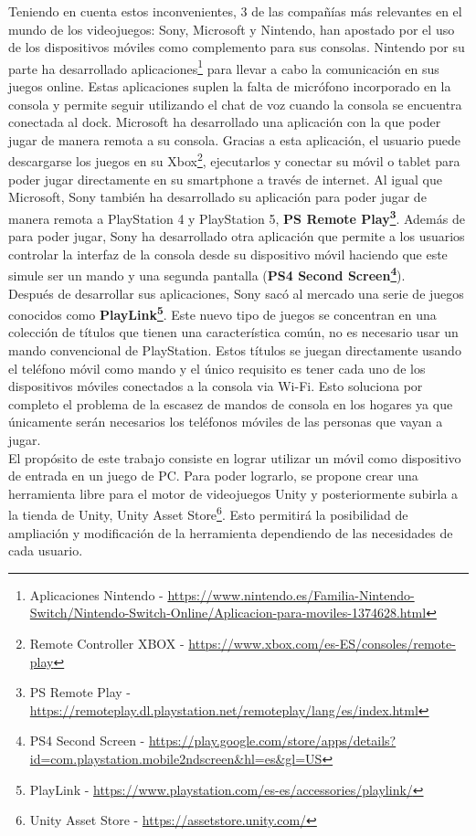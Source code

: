 Teniendo en cuenta estos inconvenientes, 3 de las compa\~n\'ias m\'as relevantes en el mundo de los videojuegos: Sony, Microsoft y Nintendo, han apostado por el uso de los dispositivos m\'oviles como complemento para sus consolas. Nintendo por su parte ha desarrollado aplicaciones\footnote{Aplicaciones Nintendo - \url{https://www.nintendo.es/Familia-Nintendo-Switch/Nintendo-Switch-Online/Aplicacion-para-moviles-1374628.html}} para llevar a cabo la comunicaci\'on en sus juegos online. Estas aplicaciones suplen la falta de micr\'ofono incorporado en la consola y permite seguir utilizando el chat de voz cuando la consola se encuentra conectada al dock. Microsoft ha desarrollado una aplicaci\'on con la que poder jugar de manera remota a su consola. Gracias a esta aplicaci\'on, el usuario puede descargarse los juegos en su Xbox\footnote{ Remote Controller XBOX - \url{https://www.xbox.com/es-ES/consoles/remote-play}}, ejecutarlos y conectar su m\'ovil o tablet para poder jugar directamente en su smartphone a trav\'es de internet. Al igual que Microsoft, Sony tambi\'en ha desarrollado su aplicaci\'on para poder jugar de manera remota a PlayStation 4 y PlayStation 5, \textbf{PS Remote Play\footnote{PS Remote Play - \url{https://remoteplay.dl.playstation.net/remoteplay/lang/es/index.html}}}. Adem\'as de para poder jugar, Sony ha desarrollado otra aplicaci\'on que permite a los usuarios controlar la interfaz de la consola desde su dispositivo m\'ovil haciendo que este simule ser un mando y una segunda pantalla (\textbf{PS4 Second Screen\footnote{PS4 Second Screen - \url{https://play.google.com/store/apps/details?id=com.playstation.mobile2ndscreen&hl=es&gl=US}}}).\\

Despu\'es de desarrollar sus aplicaciones, Sony sac\'o al mercado una serie de juegos conocidos como \textbf{PlayLink\footnote{PlayLink - \url{https://www.playstation.com/es-es/accessories/playlink/}}}. Este nuevo tipo de juegos se concentran en una colecci\'on de t\'itulos que tienen una caracter\'istica com\'un, no es necesario usar un mando convencional de PlayStation. Estos t\'itulos se juegan directamente usando el tel\'efono m\'ovil como mando y el \'unico requisito es tener cada uno de los dispositivos m\'oviles conectados a la consola via Wi-Fi. Esto soluciona por completo el problema de la escasez de mandos de consola en los hogares ya que \'unicamente ser\'an necesarios los tel\'efonos m\'oviles de las personas que vayan a jugar.\\

El prop\'osito de este trabajo consiste en lograr utilizar un m\'ovil como dispositivo de entrada en un juego de PC. Para poder lograrlo, se propone crear una herramienta libre para el motor de videojuegos Unity y posteriormente subirla a la tienda de Unity, Unity Asset Store\footnote{Unity Asset Store - \url{https://assetstore.unity.com/}}. Esto permitir\'a la posibilidad de ampliaci\'on y modificaci\'on de la herramienta dependiendo de las necesidades de cada usuario.


